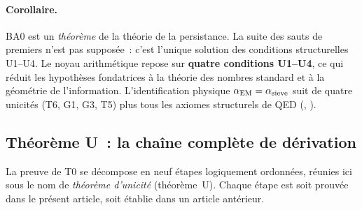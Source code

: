 \documentclass[12pt,a4paper]{article}
\begin{document}
\paragraph{Corollaire.}
BA0 est un \emph{théorème} de la théorie de la persistance. La
suite des sauts de premiers n'est pas supposée~: c'est l'unique
solution des conditions structurelles U1--U4. Le noyau arithmétique
repose sur \textbf{quatre conditions U1--U4}, ce qui réduit les
hypothèses fondatrices à la théorie des nombres standard et à la
géométrie de l'information. L'identification physique
$\alpha_{\mathrm{EM}} = \alpha_{\rm sieve}$ suit de quatre unicités (T6, G1,
G3, T5) plus tous les axiomes structurels de QED
(\cite{companion_M5}, \cite{companion_physics}).

\subsection{Théorème U~: la chaîne complète de dérivation}
\label{sec:ch25_theorem_U}

La preuve de T0 se décompose en neuf étapes logiquement ordonnées,
réunies ici sous le nom de \emph{théorème d'unicité} (théorème~U).
Chaque étape est soit prouvée dans le présent article, soit établie
dans un article antérieur.
\end{document}
